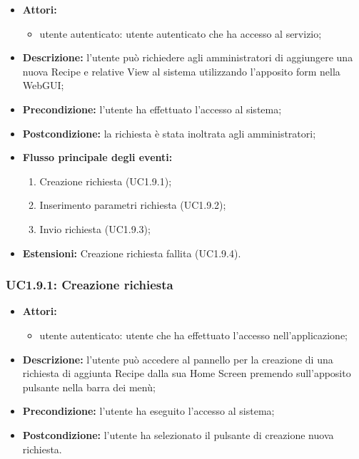 \begin{itemize}
	\item \textbf{Attori:}
	\begin{itemize}
		\item utente autenticato: utente autenticato che ha accesso al servizio;
	\end{itemize}
	\item \textbf{Descrizione:} l'utente può richiedere agli amministratori di aggiungere una nuova Recipe e relative View al sistema utilizzando l'apposito form nella WebGUI;
	\item \textbf{Precondizione:} l'utente ha effettuato l'accesso al sistema;
	\item \textbf{Postcondizione:} la richiesta è stata inoltrata agli amministratori;
	\item \textbf{Flusso principale degli eventi:}
	\begin{enumerate}
		\item Creazione richiesta (UC1.9.1);
		\item Inserimento parametri richiesta (UC1.9.2);
		\item Invio richiesta (UC1.9.3);
	\end{enumerate}
	\item \textbf{Estensioni:} Creazione richiesta fallita (UC1.9.4).
\end{itemize}

\subsubsection{UC1.9.1: Creazione richiesta}

\begin{itemize}
	\item \textbf{Attori:}
	\begin{itemize}
		\item utente autenticato: utente che ha effettuato l'accesso nell'applicazione;
	\end{itemize}
	\item \textbf{Descrizione:} l'utente può accedere al pannello per la creazione di una richiesta di aggiunta Recipe dalla sua Home Screen premendo sull'apposito pulsante nella barra dei menù;
	\item \textbf{Precondizione:} l'utente ha eseguito l'accesso al sistema;
	\item \textbf{Postcondizione:} l'utente ha selezionato il pulsante di creazione nuova richiesta.
	
\end{itemize}

